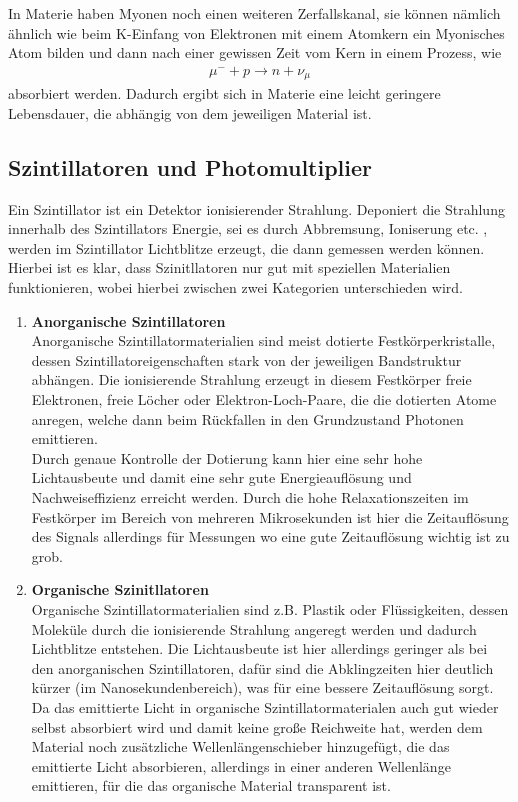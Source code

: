 In Materie haben Myonen noch einen weiteren Zerfallskanal, sie können nämlich ähnlich wie beim K-Einfang von Elektronen mit einem Atomkern ein Myonisches Atom bilden und dann nach einer gewissen Zeit vom Kern in einem Prozess, wie 
\begin{align*}
    \mu^{-} + p \rightarrow n + \nu_\mu
\end{align*}
absorbiert werden. Dadurch ergibt sich in Materie eine leicht geringere Lebensdauer, die abhängig von dem jeweiligen Material ist. 

\subsection{Szintillatoren und Photomultiplier}

Ein Szintillator ist ein Detektor ionisierender Strahlung. Deponiert die Strahlung innerhalb des Szintillators Energie, sei es durch Abbremsung, Ioniserung etc. , werden im Szintillator Lichtblitze erzeugt, die dann gemessen werden können. \\
Hierbei ist es klar, dass Szinitllatoren nur gut mit speziellen Materialien funktionieren, wobei hierbei zwischen zwei Kategorien unterschieden wird. \\

\begin{enumerate}
    \item \textbf{Anorganische Szintillatoren} \\
    Anorganische Szintillatormaterialien sind meist dotierte Festkörperkristalle, dessen Szintillatoreigenschaften stark von der jeweiligen Bandstruktur abhängen. Die ionisierende Strahlung erzeugt in diesem Festkörper freie Elektronen, freie Löcher oder Elektron-Loch-Paare, die die dotierten Atome anregen, welche dann beim Rückfallen in den Grundzustand Photonen emittieren. \\
    Durch genaue Kontrolle der Dotierung kann hier eine sehr hohe Lichtausbeute und damit eine sehr gute Energieauflösung und Nachweiseffizienz erreicht werden. Durch die hohe Relaxationszeiten im Festkörper im Bereich von mehreren Mikrosekunden ist hier die Zeitauflösung des Signals allerdings für Messungen wo eine gute Zeitauflösung wichtig ist zu grob. 

    \item \textbf{Organische Szinitllatoren} \\
    Organische Szintillatormaterialien sind z.B. Plastik oder Flüssigkeiten, dessen Moleküle durch die ionisierende Strahlung angeregt werden und dadurch Lichtblitze entstehen. Die Lichtausbeute ist hier allerdings geringer als bei den anorganischen Szintillatoren, dafür sind die Abklingzeiten hier deutlich kürzer (im Nanosekundenbereich), was für eine bessere Zeitauflösung sorgt. Da das emittierte Licht in organische Szintillatormaterialen auch gut wieder selbst absorbiert wird und damit keine große Reichweite hat, werden dem Material noch zusätzliche Wellenlängenschieber hinzugefügt, die das emittierte Licht absorbieren, allerdings in einer anderen Wellenlänge emittieren, für die das organische Material transparent ist. 
\end{enumerate}

